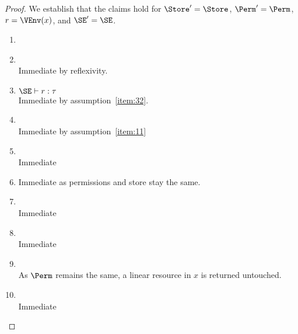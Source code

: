 \begin{proof}
  We establish that the claims hold for
  $\Store' = \Store$, $\Perm' = \Perm$, $r = \VEnv (x)$, and $\SE' = \SE$.
  \begin{enumerate}[({R}1)]
  \item \resultOk{}{}
  \item \resultEnv{}{}
    \\ Immediate by reflexivity.
  \item $\SE \vdash r : \tau$
    \\ Immediate by assumption~\ref{item:32}.
  \item \resultPermDom{}{}
    \\ Immediate by assumption~\ref{item:11}
  \item \resultReachPerm{}{}
    \\ Immediate
  \item \resultFrame{}{}{}
    Immediate as permissions and store stay the same.
  \item \resultImmutables{}{}{}
    \\ Immediate
  \item \resultMutables{}{}{}
    \\Immediate
  \item \resultResources{}{}{}
    \\ As $\Perm$ remains the same, a linear resource in $x$ is
    returned untouched.
  \item \resultThinAir{}{}
    \\ Immediate
  \end{enumerate}

\end{proof}

